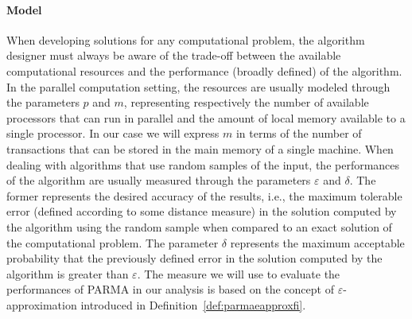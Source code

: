\paragraph*{Model}When developing solutions for any computational problem,
the algorithm designer must always be aware of the trade-off between the available
computational resources and the performance (broadly defined) of the algorithm.
In the parallel computation setting, the resources are usually modeled through
the parameters $p$ and $m$, representing respectively the number of available
processors that can run in parallel and the amount of local memory available to
a single processor. In our case we will express $m$ in terms of the number of
transactions that can be stored in the main memory of a single machine.
When dealing with algorithms that use random samples of the input, the
performances of the algorithm are usually measured through the parameters
$\varepsilon$ and $\delta$. The former represents the desired accuracy of the
results, i.e., the maximum tolerable error (defined according to some distance
measure) in the solution computed by the algorithm using the random sample
when compared to an exact solution of the computational problem. The parameter
$\delta$ represents the maximum acceptable probability that the previously
defined error in the solution computed by the algorithm is greater than
$\varepsilon$. The measure we will use to evaluate the performances of PARMA in
our analysis is based on the concept of $\varepsilon$-approximation introduced in
Definition~\ref{def:parmaeapproxfi}.


